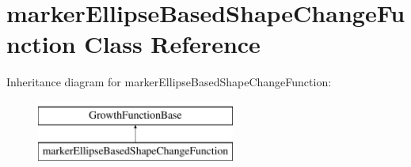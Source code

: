 \hypertarget{classmarkerEllipseBasedShapeChangeFunction}{}\section{marker\+Ellipse\+Based\+Shape\+Change\+Function Class Reference}
\label{classmarkerEllipseBasedShapeChangeFunction}
Inheritance diagram for marker\+Ellipse\+Based\+Shape\+Change\+Function\+:\begin{figure}[H]
\begin{center}
\leavevmode
\includegraphics[height=2.000000cm]{classmarkerEllipseBasedShapeChangeFunction}
\end{center}
\end{figure}
